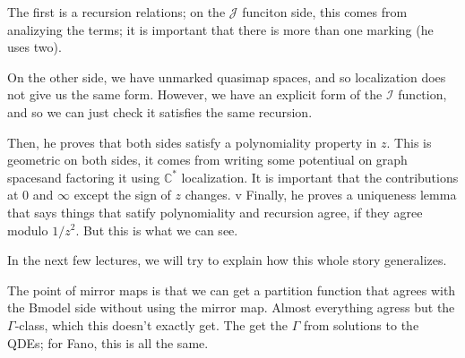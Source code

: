 \documentclass{amsart}
\theoremstyle{definition}
\newcommand{\I}{\mathcal{I}}
\newcommand{\J}{\mathcal{J}}
\newcommand{\C}{\mathbb{C}}
\begin{document}
The first is a recursion relations; on the $\J$ funciton side, this comes from analizying the terms; it is important that there is more than one marking (he uses two).

On the other side, we have unmarked quasimap spaces, and so localization does not give us the same form.  However, we have an explicit form of the $\I$ function, and so we can just check it satisfies the same recursion.

Then, he proves that both sides satisfy a polynomiality property in $z$.  This is geometric on both sides, it comes from writing some potentiual on graph spacesand factoring it using $\C^*$ localization.  It is important that the contributions at $0$ and $\infty$ except the sign of $z$ changes.
v
Finally, he proves a uniqueness lemma that says things that satify polynomiality and recursion agree, if they agree modulo $1/z^2$.  But this is what we can see.

In the next few lectures, we will try to explain how this whole story generalizes.

The point of mirror maps is that we can get a partition function that agrees with the Bmodel side without using the mirror map.  Almost everything agress but the $\Gamma$-class, which this doesn't exactly get.  The get the $\Gamma$ from solutions to the QDEs; for Fano, this is all the same.
\end{document}
